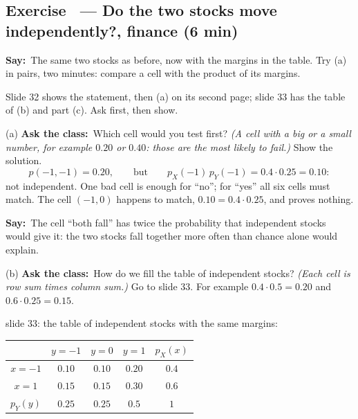 \documentclass[11pt,a4paper,parskip=half]{scrartcl}
\renewcommand{\needspace}[1]{\Needspace{6\baselineskip}}
\newcommand{\say}{\textbf{\color{teal}Say:}\ }
\newcommand{\ask}{\textbf{\color{navy}Ask the class:}\ }
\begin{document}
\needspace{0.25\textheight}
\subsection{Exercise~ --- Do the two stocks move independently?, finance (6 min)}


\say The same two stocks as before, now with the margins in the table. Try
(a) in pairs, two minutes: compare a cell with the product of its
margins.

\begin{slidecue}
	Slide 32 shows the statement, then (a) on its second page; slide 33 has
	the table of (b) and part (c). Ask first, then show.
\end{slidecue}

(a) \ask Which cell would you test first? \emph{(A cell with a big or a
small number, for example $0.20$ or $0.40$: those are the most likely to
fail.)} Show the solution.
\[ p(-1,-1)=0.20,\qquad\text{but}\qquad p_X(-1)\,p_Y(-1)=0.4\cdot0.25=0.10: \]
not independent. One bad cell is enough for ``no''; for ``yes'' all six
cells must match. The cell $(-1,0)$ happens to match,
$0.10=0.4\cdot0.25$, and proves nothing.

\say The cell ``both fall'' has twice the probability that independent
stocks would give it: the two stocks fall together more often than
chance alone would explain.

(b) \ask How do we fill the table of independent stocks? \emph{(Each cell
is row sum times column sum.)} Go to slide 33. For example
$0.4\cdot0.5=0.20$ and $0.6\cdot0.25=0.15$.

\needspace{0.2\textheight}
\begin{slidefig}
	slide 33: the table of independent stocks with the same margins:
	\begin{center}
		\renewcommand{\arraystretch}{1.25}
		\begin{tabular}{c|ccc|c}
			       & $y=-1$ & $y=0$  & $y=1$  & $p_X(x)$ \\
			\hline
			$x=-1$ & $0.10$ & $0.10$ & $0.20$ & $0.4$ \\
			$x=1$  & $0.15$ & $0.15$ & $0.30$ & $0.6$ \\
			\hline
			$p_Y(y)$ & $0.25$ & $0.25$ & $0.5$ & $1$
		\end{tabular}
	\end{center}
\end{slidefig}
\end{document}
